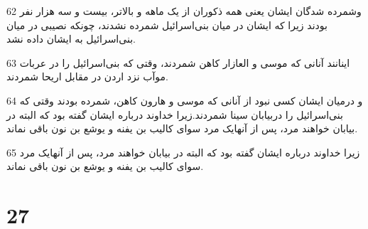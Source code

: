 \par 62 وشمرده شدگان ایشان یعنی همه ذکوران از یک ماهه و بالاتر، بیست و سه هزار نفر بودند زیرا که ایشان در میان بنی‌اسرائیل شمرده نشدند، چونکه نصیبی در میان بنی‌اسرائیل به ایشان داده نشد.
\par 63 اینانند آنانی که موسی و العازار کاهن شمردند، وقتی که بنی‌اسرائیل را در عربات موآب نزد اردن در مقابل اریحا شمردند.
\par 64 و درمیان ایشان کسی نبود از آنانی که موسی و هارون کاهن، شمرده بودند وقتی که بنی‌اسرائیل را دربیابان سینا شمردند.زیرا خداوند درباره ایشان گفته بود که البته در بیابان خواهند مرد، پس از آنهایک مرد سوای کالیب بن یفنه و یوشع بن نون باقی نماند.
\par 65 زیرا خداوند درباره ایشان گفته بود که البته در بیابان خواهند مرد، پس از آنهایک مرد سوای کالیب بن یفنه و یوشع بن نون باقی نماند.
 
\chapter{27}

